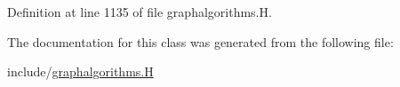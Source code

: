 Definition at line 1135 of file graphalgorithms.\+H.



The documentation for this class was generated from the following file\+:\begin{DoxyCompactItemize}
\item 
include/\hyperlink{graphalgorithms_8_h}{graphalgorithms.\+H}\end{DoxyCompactItemize}
